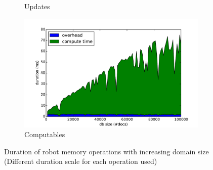 \begin{figure}[ht!]
\begin{subfigure}[b]{0.49\textwidth}
    \caption{Updates}
    \label{fig:update-durations}
  \end{subfigure}
  \begin{subfigure}[b]{0.49\textwidth}
    \hspace{-3mm}
    \includegraphics[width=1.15\textwidth]{plots/computable-durations}
    \caption{Computables}
    \label{fig:computable-durations}
  \end{subfigure}
  \caption[Duration of robot memory operations with increasing domain
  size]{Duration of robot memory operations with increasing domain
    size (Different duration scale for each operation used)}
  \label{fig:eval-durations-1}
\end{figure}


